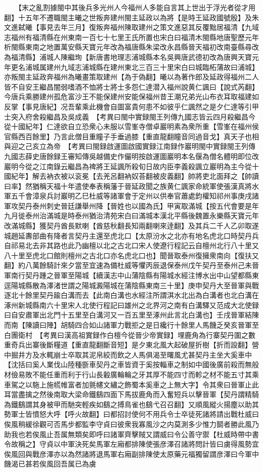 　　【末之亂割據閩中其後兵多光州人今福州人多能自言其上世出于浮光者從才用翻】十五年不遷職閩主曦之世叛奔建州閩主延政以為將【是時王延政國號殷】及朱文進弑曦【事見去年三月】復叛奔福州陳取建州之策文進惡其反覆黜居福清【九域志福州有福清縣在州東南一百七十七里王氏所置也宋白曰福清木閩縣地唐聖歷元年析閩縣東南之地置萬安縣天寶元年改為福唐縣朱梁改永昌縣晉天福初改南臺縣尋改為福清縣】浦城人陳繼珣【新唐書地理志浦城縣本名吳興唐武德初改為唐興天寶元年更名浦城属建州九域志浦城縣在建州東北三百三十里宋白曰城臨柘蒲故曰浦城】亦叛閩主延政奔福州為曦畫策取建州【為于偽翻】曦以為著作郎及延政得福州二人皆不自安王繼昌闇弱嗜酒不恤將士將士多怨仁達潜入福州說黄仁諷曰【說式芮翻】今唐兵乘勝建州孤危富沙王不能保建州安能保福州昔王潮兄弟光山布衣耳取福建如反掌【事見唐紀】况吾輩乘此機會自圖富貴何患不如彼乎仁諷然之是夕仁達等引甲士突入府舍殺繼昌及吳成義　【考異曰閩中實録閩王列傳九國志皆云四月殺繼昌今從十國紀年】仁達欲自立恐衆心未服以雪峯寺僧卓巖明素為衆所重【雪峯在福州侯官縣西百餘里】乃言此僧目重瞳子手垂過膝【重直龍翻瞳音同過音戈】真天子也相與迎之己亥立為帝　【考異曰閩録啟運圖啟國實録江南録作巖明閩中實録閩王列傳九國志薛史唐餘録王審知傳吳越備史作儼明按啟運圖巖明本名偃為僧名體明即位改巖明今從之江南錄云繼昌為禆將王延諷所殺旬日故内臣李義殺諷立巖明為主今從十國紀年】解去衲衣被以衮冕【去羌呂翻衲奴荅翻被皮義翻】帥將吏北面拜之【帥讀曰率】然猶稱天福十年遣使奉表稱藩于晉延政聞之族黄仁諷家命統軍使張漢真將水軍五千會漳泉兵討巖明乙巳杜威等諸軍會于定州以供奉官蕭處鈞權知祁州事庚戌諸軍攻契丹泰州刺史晉廷謙舉州降【晉姓也以國為氏】甲寅取滿城【按五代會要是年九月徙泰州治滿城是時泰州猶治清苑宋白曰滿城本漢北平縣後魏置永樂縣天寶元年改滿城縣】獲契丹酋長默喇【酋慈秋翻長知兩翻喇來逹翻】及其兵二千人乙卯取遂城趙延夀部曲有降者言契丹主還至虎北口【太原汾水之北亦有地名虎北口時契丹兵自祁易北去非其路也此乃幽檀以北之古北口宋人使遼行程記云自檀州北行八十里又八十里至虎北口館則檀州之古北口亦名虎北口也】聞晉取泰州復擁衆南向【復扶又翻】約八萬餘騎計來夕當至宜速為備杜威等懼丙辰退保泰州戊午契丹至泰州己未晉軍南行契丹踵之晉軍至陽城【續漢志中山蒲陰縣有陽城水經注博水出中山望都縣東逕陽城縣散為澤渚世謂之陽城澱陽城在蒲陰縣東南三十里】庚申契丹大至晉軍與戰逐北十餘里契丹踰白溝而去【此南白溝也水經注所謂淇水北出為白溝者也北白溝在涿州新城縣南六十里宋人北使行程記曰雄州之北界河之南有白溝驛又范成大北使録曰自安肅軍出北門十五里至白溝河又一百五里至涿州此言北白溝也】壬戌晉軍結陳而南【陳讀曰陣】胡騎四合如山諸軍力戰拒之是日纔行十餘里人馬饑乏癸亥晉軍至白團衛村　【考異曰漢高祖實録作白檀今從晉少帝實録】埋鹿角為行寨契丹圍之數重奇兵出寨後斷糧道【重直龍翻斷音短】是夕東北風大起破屋折樹【折而設翻】營中掘井方及水輒崩士卒取其泥帛絞而飲之人馬俱渴至曙風尤甚契丹主坐大奚車中【沈括曰奚人業伐山陸種斵車契丹之車皆資于奚按輜車之制如中國後廣前殺而無般材儉易敗不能任重而利于行山長轂廣輪輪之牙其厚不能四寸而軫之材不能五寸其乘車駕之以駞上施㡛帷富者加氈幰文繡之飾蜀本奚車之上無大字】令其衆曰晉軍止此耳當盡擒之然後南取大梁命鐵鷂四面下馬拔鹿角而入奮短兵以擊晉軍【契丹謂精騎為鐵鷂謂其身被甲而馳突輕疾如鷂之搏鳥雀也鷂弋召召翻】又順風縱火揚塵以助其勢軍士皆憤怒大呼【呼火故翻】曰都招討使何不用兵令士卒徒死諸將請出戰杜威曰俟風稍緩徐觀可否馬步都監李守貞曰彼衆我寡風沙之内莫測多少惟力鬬者勝此風乃助我也若俟風止吾属無類矣即呼曰諸軍齊擊賊又謂威曰令公善守禦【杜威時帶中書令故稱之】守貞以中軍決死矣馬軍左廂都排陳使張彦澤召諸將問計皆曰虜得風勢宜俟風回與戰彦澤亦以為然諸將退馬軍右廂副排陳使太原藥元福獨留謂彦澤曰今軍中饑渴已甚若俟風回吾属已為虜